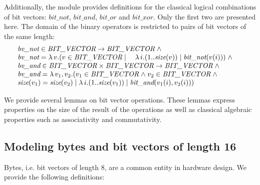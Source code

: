 \documentclass[a4paper]{llncs}
\begin{document}
%
%


Additionally, the module provides definitions for the classical
logical combinations of bit vectors: $\textit{bit\_not}$,
$\textit{bit\_and}$, $\textit{bit\_or}$ and $\textit{bit\_xor}$. Only
the first two are presented here. The domain of the binary operators
is restricted to pairs of bit vectors of the same length:\newline
$$
\hspace*{-0.2in}\begin{array}{l}
\textit{bv\_not} \in \textit{BIT\_VECTOR} \fun \textit{BIT\_VECTOR} \land \\
\textit{bv\_not} = \lambda v . (v \in \textit{BIT\_VECTOR} \mid \quad \lambda i . (1 .. \textit{size}(v)) \mid \textit{bit\_not}(v(i))) \land \\
\textit{bv\_and} \in \textit{BIT\_VECTOR} \times \textit{BIT\_VECTOR} \fun \textit{BIT\_VECTOR} \land \\
\textit{bv\_and} = \lambda v_1, v_2 . (v_1 \in \textit{BIT\_VECTOR} \land v_2 \in \textit{BIT\_VECTOR} \land \\
\textit{size}(v_1) = \textit{size}(v_2) \mid \lambda i . (1 .. \textit{size}(v_1)) \mid
\textit{bit\_and}(v_1(i), v_2(i)))
\end{array}
$$


We provide several lemmas on bit vector operations. These lemmas
express properties on the size of the result of the operations
as well as classical algebraic properties such as associativity
and commutativity.

\subsection{Modeling bytes and bit vectors of length 16}
\label{subsec:HardwareLibrary3}

Bytes, i.e. bit vectors of length 8, are a common entity in hardware
design. We provide the following definitions:
\end{document}
